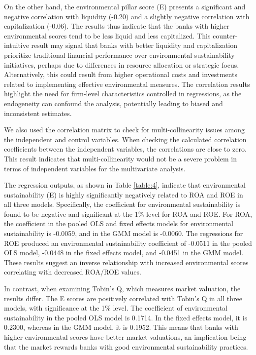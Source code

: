 \documentclass[11pt, a4paper]{article}
\begin{document}
On the other hand, the environmental pillar score (E) presents a significant and negative correlation with liquidity (-0.20) and a slightly negative correlation with capitalization (-0.06). The results thus indicate that the banks with higher environmental scores tend to be less liquid and less capitalized. This counter-intuitive result may signal that banks with better liquidity and capitalization prioritize traditional financial performance over environmental sustainability initiatives, perhaps due to differences in resource allocation or strategic focus. Alternatively, this could result from higher operational costs and investments related to implementing effective environmental measures. The correlation results highlight the need for firm-level characteristics controlled in regressions, as the endogeneity can confound the analysis, potentially leading to biased and inconsistent estimates. 

We also used the correlation matrix to check for multi-collinearity issues among the independent and control variables. When checking the calculated correlation coefficients between the independent variables, the correlations are close to zero. This result indicates that multi-collinearity would not be a severe problem in terms of independent variables for the multivariate analysis. 

The regression outputs, as shown in Table \ref{table:4}, indicate that environmental sustainability (E) is highly significantly negatively related to ROA and ROE in all three models. Specifically, the coefficient for environmental sustainability is found to be negative and significant at the 1\% level for ROA and ROE. For ROA, the coefficient in the pooled OLS  and fixed effects models for environmental sustainability is -0.0059, and in the GMM model is -0.0060. The regressions for ROE produced an environmental sustainability coefficient of -0.0511 in the pooled OLS model, -0.0448 in the fixed effects model, and -0.0451 in the GMM model. These results suggest an inverse relationship with increased environmental scores correlating with decreased ROA/ROE values.

In contrast, when examining Tobin's Q, which measures market valuation, the results differ. The E scores are positively correlated with Tobin’s Q in all three models, with significance at the 1\% level. The coefficient of environmental sustainability in the pooled OLS model is 0.1714. In the fixed effects model, it is 0.2300, whereas in the GMM model, it is 0.1952. This means that banks with higher environmental scores have better market valuations, an implication being that the market rewards banks with good environmental sustainability practices. 
\end{document}
